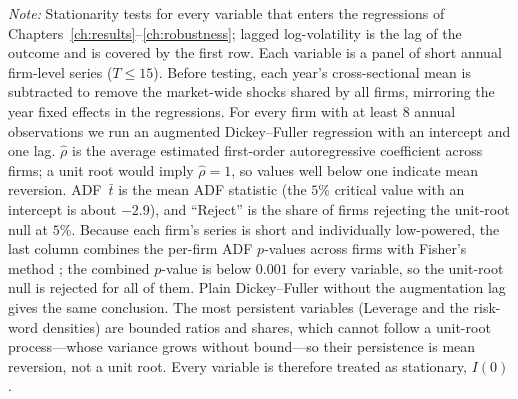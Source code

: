 \begin{table}[htbp]
\textit{Note:} Stationarity tests for every variable that enters the regressions of Chapters~\ref{ch:results}--\ref{ch:robustness}; lagged log-volatility is the lag of the outcome and is covered by the first row. Each variable is a panel of short annual firm-level series ($T \leq 15$). Before testing, each year's cross-sectional mean is subtracted to remove the market-wide shocks shared by all firms, mirroring the year fixed effects in the regressions. For every firm with at least 8 annual observations we run an augmented Dickey--Fuller regression \parencite{dickeyfuller1979} with an intercept and one lag. $\hat\rho$ is the average estimated first-order autoregressive coefficient across firms; a unit root would imply $\hat\rho = 1$, so values well below one indicate mean reversion. ADF~$\bar t$ is the mean ADF statistic (the $5\%$ critical value with an intercept is about $-2.9$), and ``Reject'' is the share of firms rejecting the unit-root null at $5\%$. Because each firm's series is short and individually low-powered, the last column combines the per-firm ADF $p$-values across firms with Fisher's method \parencite{maddala1999}; the combined $p$-value is below $0.001$ for every variable, so the unit-root null is rejected for all of them. Plain Dickey--Fuller without the augmentation lag gives the same conclusion. The most persistent variables (Leverage and the risk-word densities) are bounded ratios and shares, which cannot follow a unit-root process---whose variance grows without bound---so their persistence is mean reversion, not a unit root. Every variable is therefore treated as stationary, $I(0)$.
\end{table}